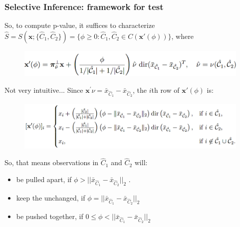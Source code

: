 \documentclass{beamer}
\begin{document}
	\begin{frame}
		\frametitle{Selective Inference: framework for test}
	So, to compute p-value, it suffices to characterize $\hat{S}=S(\bm{x}; \{\hat{C}_1, \hat{C}_2\}) = \{\phi \geq 0: \hat{C}_1, \hat{C}_2 \in C(\bm{x}'(\phi))\}$, where 
	\begin{figure}
		\includegraphics[width=.8\linewidth]{image009.png}
	\end{figure}
	Not very intuitive... Since $\bm{x}^{'}\hat{\nu} = \bar{x}_{\hat{C}_1} - \bar{x}_{\hat{C}_2}$, the $i$th row of $\bm{x}'(\phi)$ is:
	\begin{figure}
		\includegraphics[width=.8\linewidth]{image010.png}
	\end{figure}
	So, that means observations in $\hat{C}_1 $ and $\hat{C}_2$ will:
	\begin{itemize}
		\item
		be pulled apart, if $\phi > ||\bar{x}_{\hat{C}_1} - \bar{x}_{\hat{C}_2}||_2$ .
		\item
		keep the unchanged, if $\phi = ||\bar{x}_{\hat{C}_1} - \bar{x}_{\hat{C}_2}||_2$
		\item
		be pushed together, if $0 \leq \phi < ||\bar{x}_{\hat{C}_1} - \bar{x}_{\hat{C}_2}||_2$
	\end{itemize}
	\end{frame}
	
\end{document}
